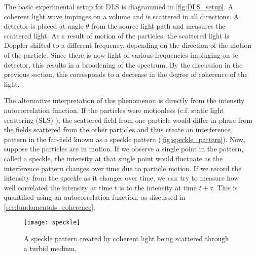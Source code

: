 The basic experimental setup for DLS is diagrammed in \autoref{fig:DLS_setup}. A coherent light wave impinges on a volume and is scattered in all directions. A detector is placed at angle $\theta$ from the source light path and measures the scattered light. As a result of motion of the particles, the scattered light is Doppler shifted to a different frequency, depending on the direction of the motion of the particle. Since there is now light of various frequencies impinging on te detector, this results in a broadening of the spectrum. By the discussion in the previous section, this corresponds to a decrease in the degree of coherence of the light. 

The alternative interpretation of this phenomenon is directly from the intensity autocorrelation function. If the particles were motionless (c.f. static light scattering (SLS) \cite{Malvern2013}), the scattered field from one particle would differ in phase from the fields scattered from the other particles and thus create an interference pattern in the far-field known as a speckle pattern (\autoref{fig:speckle_pattern}). Now, suppose the particles are in motion. If we observe a single point in the pattern, called a speckle, the intensity at that single point would fluctuate as the interference pattern changes over time due to particle motion. If we record the intensity from the speckle as it changes over time, we can try to measure how well correlated the intensity at time $t$ is to the intensity at time $t+\tau$. This is quantified using an autocorrelation function, as discussed in \autoref{sec:fundamentals_coherence}. 

\begin{figure}[tb]
    \centering
    \texttt{[image: speckle]}
    \caption{A speckle pattern created by coherent light being scattered through a turbid medium.}
    \label{fig:speckle_pattern}
\end{figure}

